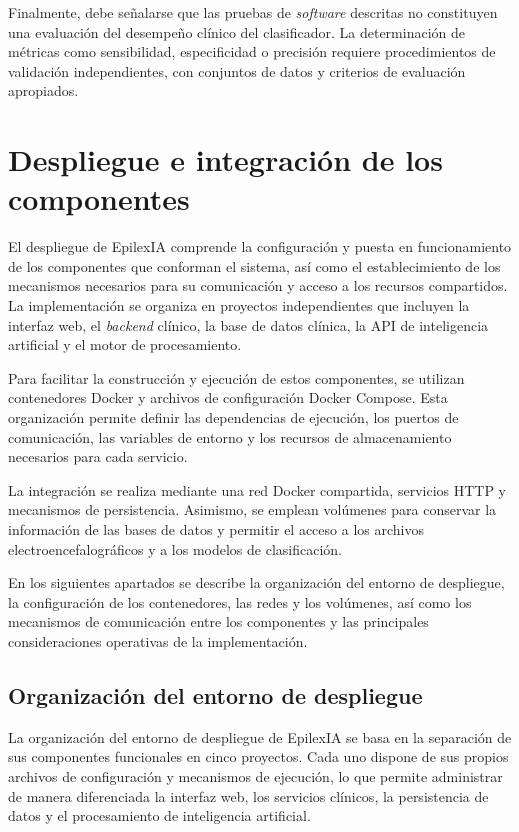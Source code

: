 Finalmente, debe señalarse que las pruebas de \textit{software}
descritas no constituyen una evaluación del desempeño
clínico del clasificador. La determinación de métricas
como sensibilidad, especificidad o precisión requiere
procedimientos de validación independientes, con
conjuntos de datos y criterios de evaluación apropiados.


\section{Despliegue e integración de los componentes}

El despliegue de EpilexIA comprende la configuración y puesta en
funcionamiento de los componentes que conforman el sistema, así
como el establecimiento de los mecanismos necesarios para su
comunicación y acceso a los recursos compartidos. La implementación
se organiza en proyectos independientes que incluyen la interfaz
web, el \textit{backend} clínico, la base de datos clínica, la API de
inteligencia artificial y el motor de procesamiento.

Para facilitar la construcción y ejecución de estos componentes,
se utilizan contenedores Docker y archivos de configuración
Docker Compose. Esta organización permite definir las dependencias
de ejecución, los puertos de comunicación, las variables de
entorno y los recursos de almacenamiento necesarios para cada
servicio.

La integración se realiza mediante una red Docker compartida,
servicios HTTP y mecanismos de persistencia. Asimismo, se
emplean volúmenes para conservar la información de las bases
de datos y permitir el acceso a los archivos electroencefalográficos
y a los modelos de clasificación.

En los siguientes apartados se describe la organización del
entorno de despliegue, la configuración de los contenedores,
las redes y los volúmenes, así como los mecanismos de
comunicación entre los componentes y las principales
consideraciones operativas de la implementación.

\subsection{Organización del entorno de despliegue}

La organización del entorno de despliegue de EpilexIA se basa
en la separación de sus componentes funcionales en cinco
proyectos. Cada uno dispone de sus propios archivos de
configuración y mecanismos de ejecución, lo que permite
administrar de manera diferenciada la interfaz web, los
servicios clínicos, la persistencia de datos y el procesamiento
de inteligencia artificial.

